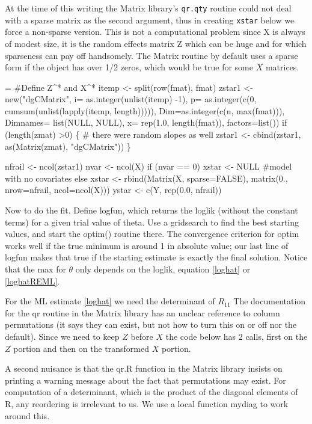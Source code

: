 \documentclass{article}
\begin{document}
At the time of this writing the Matrix library's \Verb!qr.qty! routine  %
could not deal with a sparse matrix as the second argument,
thus in creating \Verb!xstar! below we force a non-sparse version.
This is not a computational problem since X is always of modest size,
it is the random effects matrix Z which can be huge and for which
sparseness can pay off handsomely.
The Matrix routine by
default uses a sparse form if the object has over 1/2 zeros,
which would be true for some $X$ matrices.
\begin{nwchunk}
=
 #Define Z^* and X^*
 itemp <- split(row(fmat), fmat)
 zstar1 <- new("dgCMatrix", 
               i= as.integer(unlist(itemp) -1),
               p= as.integer(c(0, cumsum(unlist(lapply(itemp, length))))),
               Dim=as.integer(c(n, max(fmat))),
               Dimnames= list(NULL, NULL),
               x= rep(1.0, length(fmat)),
               factors=list())
 if (length(zmat) >0)  \{
     # there were random slopes as well
     zstar1 <- cbind(zstar1, as(Matrix(zmat), "dgCMatrix"))
 \}
 
 nfrail <- ncol(zstar1)
 nvar <- ncol(X)
 if (nvar == 0)  xstar <- NULL  #model with no covariates
 else xstar <- rbind(Matrix(X, sparse=FALSE),
                     matrix(0., nrow=nfrail, ncol=ncol(X)))
 ystar <- c(Y, rep(0.0, nfrail))
\end{nwchunk}

Now to do the fit. 
Define logfun, which returns the loglik (without the constant terms) for
a given trial value of theta.
Use a gridsearch to find the best starting values, and start the
optim() routine there.
The convergence criterion for optim works well if the true minimum is
around 1 in absolute value; our last line of logfun makes that true 
if the starting estimate is exactly the final solution.
Notice that the max for $\theta$ only depends on the loglik,
equation \ref{loghat} or \ref{loghatREML}.

For the ML estimate \ref{loghat} we need the determinant of $R_{11}$
The documentation for the qr routine in the Matrix library has an
unclear reference to column permutations (it says they can exist, but
not how to turn this on or off nor the default).  Since we need to
keep $Z$ before $X$ the code below has 2 calls, first on the $Z$
portion and then on the transformed $X$ portion.

A second nuisance is that the qr.R function in the Matrix
library insists on printing a warning message about the fact
that permutations may exist.  For computation of a determinant,
which is the product of the diagonal elements of R,
any reordering is irrelevant to us.  We use a local function
mydiag to work around this.
\end{document}
